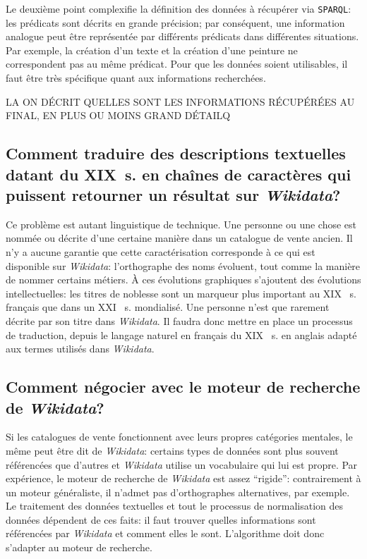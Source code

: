 \documentclass[a4paper, 12pt, twoside]{book}
\newcommand{\scl}[1]{%
	#1%
	\ifthenelse{\equal{#1}{I}}{\up{er}}{\up{ème}}%
	~s.%
}
\newcommand{\sparql}{\texttt{SPARQL}}
\newcommand{\wkd}{\textit{Wikidata}}
\begin{document}
Le deuxième point complexifie la définition des données à récupérer via \sparql{}: les prédicats sont décrits en grande précision; par conséquent, une information analogue peut être représentée par différents prédicats dans différentes situations. Par exemple, la création d'un texte et la création d'une peinture ne correspondent pas au même prédicat. Pour que les données soient utilisables, il faut être très spécifique quant aux informations recherchées. 


LA ON DÉCRIT QUELLES SONT LES INFORMATIONS RÉCUPÉRÉES AU FINAL, EN PLUS OU MOINS GRAND DÉTAILQ


\subsection{Comment traduire des descriptions textuelles datant du XIX~s. en chaînes de caractères qui puissent retourner un résultat sur \wkd{}?} 
Ce problème est autant linguistique de technique. Une personne ou une chose est nommée ou décrite d'une certaine manière dans un catalogue de vente ancien. Il n'y a aucune garantie que cette caractérisation corresponde à ce qui est disponible sur \wkd{}: l'orthographe des noms évoluent, tout comme la manière de nommer certains métiers. À ces évolutions graphiques s'ajoutent des évolutions intellectuelles: les titres de noblesse sont un marqueur plus important au \scl{XIX} français que dans un \scl{XXI} mondialisé. Une personne n'est que rarement décrite par son titre dans \wkd{}. Il faudra donc mettre en place un processus de traduction, depuis le langage naturel en français du \scl{XIX} en anglais adapté aux termes utilisés dans \wkd{}.

\subsection{Comment négocier avec le moteur de recherche de \wkd{}?} 
Si les catalogues de vente fonctionnent avec leurs propres catégories mentales, le même peut être dit de \wkd{}: certains types de données sont plus souvent référencées que d'autres et \wkd{} utilise un vocabulaire qui lui est propre. Par expérience, le moteur de recherche de \wkd{} est assez \enquote{rigide}: contrairement à un moteur généraliste, il n'admet pas d'orthographes alternatives, par exemple. Le traitement des données textuelles et tout le processus de normalisation des données dépendent de ces faits: il faut trouver quelles informations sont référencées par \wkd{} et comment elles le sont. L'algorithme doit donc s'adapter au moteur de recherche. 
\end{document}
